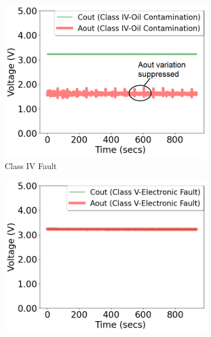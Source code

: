 \documentclass[manuscript,screen,review]{acmart} %
\providecommand{\DIFaddbeginFL}{} %
\providecommand{\DIFaddendFL}{} %
\providecommand{\DIFdelbeginFL}{} %
\providecommand{\DIFdelendFL}{} %
\newcommand{\DIFscaledelfig}{0.5}
\newlength{\DIFdelgraphicswidth} %
\newlength{\DIFdelgraphicsheight} %
\newcommand{\DIFaddincludegraphics}[2][]{{\color{blue}\fbox{\DIFOincludegraphics[#1]{#2}}}} %
\newcommand{\DIFdelincludegraphics}[2][]{%
\sbox{\DIFdelgraphicsbox}{\DIFOincludegraphics[#1]{#2}}%
\settoboxwidth{\DIFdelgraphicswidth}{\DIFdelgraphicsbox} %
\settoboxtotalheight{\DIFdelgraphicsheight}{\DIFdelgraphicsbox} %
\scalebox{\DIFscaledelfig}{%
\parbox[b]{\DIFdelgraphicswidth}{\usebox{\DIFdelgraphicsbox}\\[-\baselineskip] \rule{\DIFdelgraphicswidth}{0em}}\llap{\resizebox{\DIFdelgraphicswidth}{\DIFdelgraphicsheight}{%
\setlength{\unitlength}{\DIFdelgraphicswidth}%
\begin{picture}(1,1)%
\thicklines\linethickness{2pt} %
{\color[rgb]{1,0,0}\put(0,0){\framebox(1,1){}}}%
{\color[rgb]{1,0,0}\put(0,0){\line( 1,1){1}}}%
{\color[rgb]{1,0,0}\put(0,1){\line(1,-1){1}}}%
\end{picture}%
}\hspace*{3pt}}} %
} %
\DeclareRobustCommand{\DIFaddbeginFL}{\DIFOaddbeginFL \let\includegraphics\DIFaddincludegraphics} %
\DeclareRobustCommand{\DIFaddendFL}{\DIFOaddendFL \let\includegraphics\DIFOincludegraphics} %
\DeclareRobustCommand{\DIFdelbeginFL}{\DIFOdelbeginFL \let\includegraphics\DIFdelincludegraphics} %
\DeclareRobustCommand{\DIFdelendFL}{\DIFOaddendFL \let\includegraphics\DIFOincludegraphics} %
\begin{document}
\begin{figure}[b]
\DIFdelendFL \DIFaddbeginFL \begin{subfigure}[t]{0.3\textwidth}
		\DIFaddendFL \centering
		\DIFdelbeginFL %
\DIFdelendFL \DIFaddbeginFL \includegraphics[width=\textwidth]{figures/2-PIR-Fault/normal-classIV/classIV_summary.png}
		\DIFaddendFL \caption{Class IV Fault}
		\label{fig:pir_sensor_controlled_d}
	\end{subfigure}\DIFdelbeginFL %
\DIFdelendFL \DIFaddbeginFL \begin{subfigure}[t]{0.3\textwidth}
		\DIFaddendFL \centering
		\DIFdelbeginFL %
\DIFdelendFL \DIFaddbeginFL \includegraphics[width=\textwidth]{figures/2-PIR-Fault/normal-classV/classV_summary.png}

\end{subfigure}
\end{figure}
\end{document}
